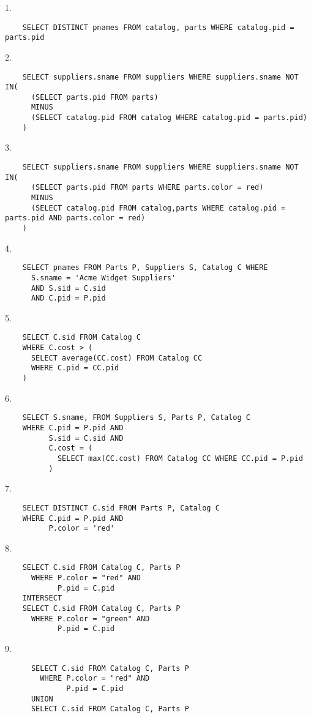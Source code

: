 \begin{problem}{5.2}
  1. \begin{lstlisting}
    SELECT DISTINCT pnames FROM catalog, parts WHERE catalog.pid = parts.pid
  \end{lstlisting}
  2. \begin{lstlisting}
    SELECT suppliers.sname FROM suppliers WHERE suppliers.sname NOT IN(
      (SELECT parts.pid FROM parts)
      MINUS
      (SELECT catalog.pid FROM catalog WHERE catalog.pid = parts.pid)
    )
  \end{lstlisting}
  3. \begin{lstlisting}
    SELECT suppliers.sname FROM suppliers WHERE suppliers.sname NOT IN(
      (SELECT parts.pid FROM parts WHERE parts.color = red)
      MINUS
      (SELECT catalog.pid FROM catalog,parts WHERE catalog.pid = parts.pid AND parts.color = red)
    )
  \end{lstlisting}
  4. \begin{lstlisting}
    SELECT pnames FROM Parts P, Suppliers S, Catalog C WHERE
      S.sname = 'Acme Widget Suppliers'
      AND S.sid = C.sid
      AND C.pid = P.pid
  \end{lstlisting}
  5. \begin{lstlisting}
    SELECT C.sid FROM Catalog C
    WHERE C.cost > (
      SELECT average(CC.cost) FROM Catalog CC
      WHERE C.pid = CC.pid
    )
  \end{lstlisting}
  6. \begin{lstlisting}
    SELECT S.sname, FROM Suppliers S, Parts P, Catalog C
    WHERE C.pid = P.pid AND
          S.sid = C.sid AND
          C.cost = (
            SELECT max(CC.cost) FROM Catalog CC WHERE CC.pid = P.pid
          )
  \end{lstlisting}
  7. \begin{lstlisting}
    SELECT DISTINCT C.sid FROM Parts P, Catalog C
    WHERE C.pid = P.pid AND
          P.color = 'red'
  \end{lstlisting}
  8. \begin{lstlisting}
    SELECT C.sid FROM Catalog C, Parts P
      WHERE P.color = "red" AND
            P.pid = C.pid
    INTERSECT
    SELECT C.sid FROM Catalog C, Parts P
      WHERE P.color = "green" AND
            P.pid = C.pid
  \end{lstlisting}
  9. \begin{lstlisting}
      SELECT C.sid FROM Catalog C, Parts P
        WHERE P.color = "red" AND
              P.pid = C.pid
      UNION
      SELECT C.sid FROM Catalog C, Parts P

\end{lstlisting}
\end{problem}
